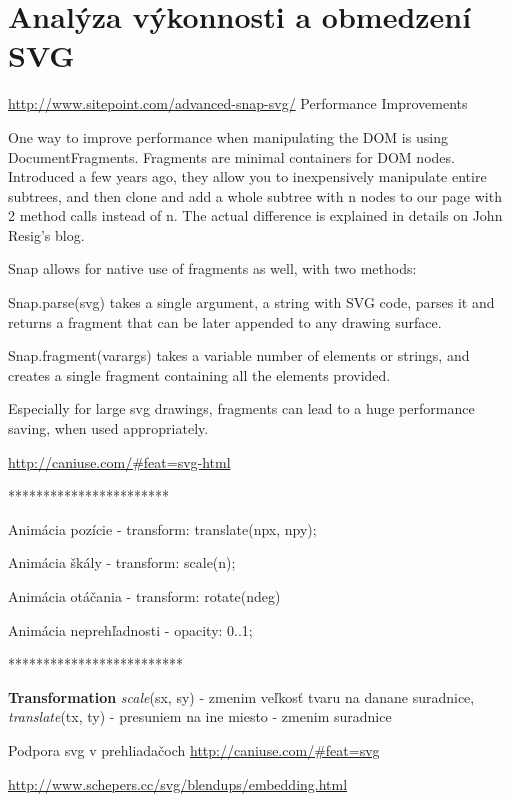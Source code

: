 \chapter{Analýza výkonnosti a obmedzení SVG}

\url{http://www.sitepoint.com/advanced-snap-svg/}
Performance Improvements

One way to improve performance when manipulating the DOM is using DocumentFragments. Fragments are minimal containers for DOM nodes. Introduced a few years ago, they allow you to inexpensively manipulate entire subtrees, and then clone and add a whole subtree with n nodes to our page with 2 method calls instead of n. The actual difference is explained in details on John Resig’s blog.

Snap allows for native use of fragments as well, with two methods:

Snap.parse(svg) takes a single argument, a string with SVG code, parses it and returns a fragment that can be later appended to any drawing surface.

Snap.fragment(varargs) takes a variable number of elements or strings, and creates a single fragment containing all the elements provided.

Especially for large svg drawings, fragments can lead to a huge performance saving, when used appropriately.


\newpage


\url{http://caniuse.com/#feat=svg-html}


***********************

Animácia pozície 
- transform: translate(npx, npy);

Animácia škály 
- transform: scale(n);

Animácia otáčania
- transform: rotate(ndeg)

Animácia neprehľadnosti 
- opacity: 0..1;

*************************



\textbf{Transformation}
\textit{scale}(sx, sy) - zmenim veľkosť tvaru na danane suradnice, 
\textit{translate}(tx, ty) - presuniem na ine miesto - zmenim suradnice 


Podpora svg v prehliadačoch
\url{http://caniuse.com/#feat=svg}

\url{http://www.schepers.cc/svg/blendups/embedding.html}